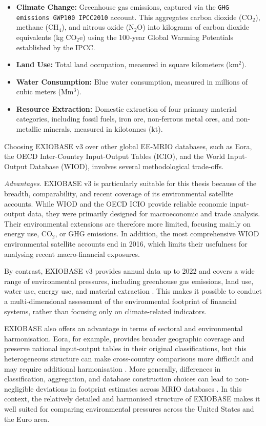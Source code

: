 \begin{itemize}
    \item \textbf{Climate Change:} Greenhouse gas emissions, captured via the \texttt{GHG emissions GWP100 IPCC2010} account. This aggregates carbon dioxide (CO$_2$), methane (CH$_4$), and nitrous oxide (N$_2$O) into kilograms of carbon dioxide equivalents (kg CO$_2$e) using the 100-year Global Warming Potentials established by the IPCC.
    \item \textbf{Land Use:} Total land occupation, measured in square kilometers (km$^2$).
    \item \textbf{Water Consumption:} Blue water consumption, measured in millions of cubic meters (Mm$^3$).
    \item \textbf{Resource Extraction:} Domestic extraction of four primary material categories, including fossil fuels, iron ore, non-ferrous metal ores, and non-metallic minerals, measured in kilotonnes (kt).
\end{itemize}

Choosing EXIOBASE v3 over other global EE-MRIO databases, such as Eora, the OECD Inter-Country Input-Output Tables (ICIO), and the World Input-Output Database (WIOD), involves several methodological trade-offs.

\textit{Advantages.} EXIOBASE v3 is particularly suitable for this thesis because of the breadth, comparability, and recent coverage of its environmental satellite accounts. While WIOD \citep{timmer_illustrated_2015} and the OECD ICIO \citep{oecd_inter-country_2026} provide reliable economic input-output data, they were primarily designed for macroeconomic and trade analysis. Their environmental extensions are therefore more limited, focusing mainly on energy use, CO$_2$, or GHG emissions. In addition, the most comprehensive WIOD environmental satellite accounts end in 2016, which limits their usefulness for analysing recent macro-financial exposures.

By contrast, EXIOBASE v3 provides annual data up to 2022 and covers a wide range of environmental pressures, including greenhouse gas emissions, land use, water use, energy use, and material extraction \citep{stadler_exiobase_2018}. This makes it possible to conduct a multi-dimensional assessment of the environmental footprint of financial systems, rather than focusing only on climate-related indicators.

EXIOBASE also offers an advantage in terms of sectoral and environmental harmonisation. Eora, for example, provides broader geographic coverage and preserve national input-output tables in their original classifications, but this heterogeneous structure can make cross-country comparisons more difficult and may require additional harmonisation \citep{lenzen_building_2013, casella_unctad_2019}. More generally, differences in classification, aggregation, and database construction choices can lead to non-negligible deviations in footprint estimates across MRIO databases \citep{giljum_impacts_2019}. In this context, the relatively detailed and harmonised structure of EXIOBASE makes it well suited for comparing environmental pressures across the United States and the Euro area.


